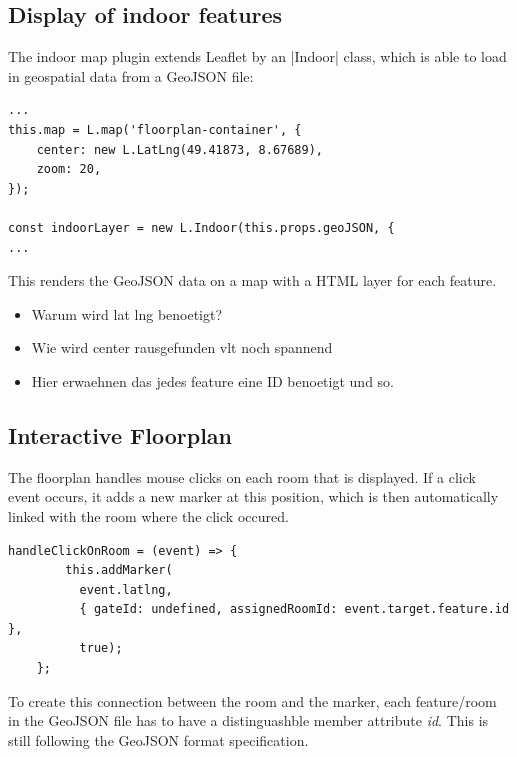 \subsection{Display of indoor features}
\label{Display of indoor features}

The indoor map plugin extends Leaflet by an |Indoor| class, which is able to load in geospatial data from a GeoJSON file:

\begin{lstlisting}[label=setupMap]
...
this.map = L.map('floorplan-container', {
	center: new L.LatLng(49.41873, 8.67689),
	zoom: 20,
});

const indoorLayer = new L.Indoor(this.props.geoJSON, {
...
\end{lstlisting}

This renders the GeoJSON data on a map with a HTML layer for each feature.

\begin{itemize}
\item Warum wird lat lng benoetigt?

\item Wie wird center rausgefunden vlt noch spannend

\item Hier erwaehnen das jedes feature eine ID benoetigt und so.
\end{itemize}





\subsection{Interactive Floorplan}
\label{Interactive Floorplan}

The floorplan handles mouse clicks on each room that is displayed. If a click event occurs, it adds a new marker at this position, which is then automatically linked with the room where the click occured.

\begin{lstlisting}[label=addMarkers]
handleClickOnRoom = (event) => {
        this.addMarker(
          event.latlng, 
          { gateId: undefined, assignedRoomId: event.target.feature.id }, 
          true);
    };
\end{lstlisting}

To create this connection between the room and the marker, each feature/room in the GeoJSON file has to have a distinguashble member attribute \emph{id}. This is still following the GeoJSON format specification.

